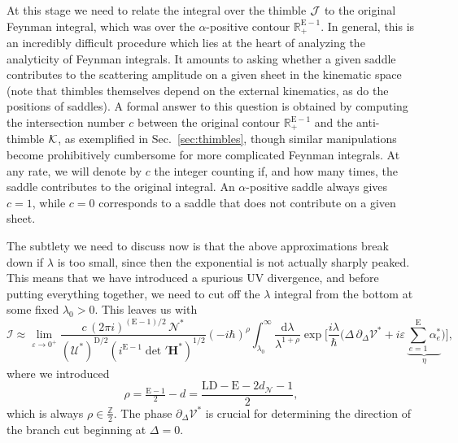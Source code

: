 \documentclass[12pt]{article}
\numberwithin{figure}{section}
\def \be {\begin{equation}}
\def \ee {\end{equation}}
\def \R {\mathbb{R}}
\def \D {\mathrm{D}}
\def \E {\mathrm{E}}
\def \L {\mathrm{L}}
\def \U {\mathcal{U}}
\def \d {\mathrm{d}}
\def \eps {\varepsilon}
\def \V {\mathcal{V}}
\def \I {\mathcal{I}}
\def \Z {\mathbb{Z}}
\def \N {\mathcal{N}}
\def \upgamma {\rho}
\begin{document}
	At this stage we need to relate the integral over the thimble $\cal J$ to the original Feynman integral, which was over the $\alpha$-positive contour $\R_{+}^{\E-1}$. In general, this is an incredibly difficult procedure which lies at the heart of analyzing the analyticity of Feynman integrals. It amounts to asking whether a given saddle contributes to the scattering amplitude on a given sheet in the kinematic space (note that thimbles themselves depend on the external kinematics, as do the positions of saddles). A formal answer to this question is obtained by computing the intersection number $c$ between the original contour $\R_{+}^{\E-1}$ and the anti-thimble $\cal K$, as exemplified in Sec.~\ref{sec:thimbles}, though similar manipulations become prohibitively cumbersome for more complicated Feynman integrals.
	At any rate, we will denote by $c$ the integer counting if, and how many times, the saddle contributes to the original integral. An $\alpha$-positive saddle always gives $c=1$, while $c=0$ corresponds to a saddle that does not contribute on a given sheet.
	
	The subtlety we need to discuss now is that the above approximations break down if $\lambda$ is too small, since then the exponential is not actually sharply peaked. This means that we have introduced a spurious UV divergence, and before putting everything together, we need to cut off the $\lambda$ integral from the bottom at some fixed $\lambda_0 > 0$. This leaves us with
	\be
	\I \approx \lim_{\eps \to 0^+} \frac{c\, (2\pi i)^{(\E-1)/2}\, \N^\ast}{(\U^\ast)^{\D/2} (i^{\E-1} \det' \mathbf{H}^\ast)^{1/2}} (-i\hbar)^{\upgamma}  \int_{\lambda_0}^\infty \frac{\d\lambda}{\lambda^{1+\upgamma}} \exp \bigg[ \frac{i\lambda}{\hbar} \bigg(\Delta \, \partial_\Delta \V^\ast + i\eps\, \underbrace{{\textstyle\sum_{e=1}^{\E}}\alpha_e^\ast}_{\eta}\bigg)\bigg],
	\ee
	where we introduced
	\be
	\upgamma = \tfrac{\E-1}{2} - d = \frac{\L\D - \E - 2d_\N - 1}{2},
	\ee
	which is always $\upgamma \in \frac{\Z}{2}$.
	The phase $\partial_\Delta \V^\ast$ is crucial for determining the direction of the branch cut beginning at $\Delta=0$.
	
\end{document}

